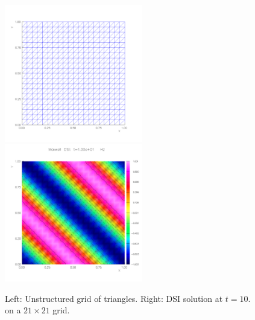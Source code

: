 \documentclass[10pt]{article}
\newcommand{\maxDoc}{\homeHenshaw/res/maxwell/doc}
\begin{document}
{
\newcommand{\figWidtha}{6cm}
\begin{figure}
\begin{center}
\includegraphics[width=\figWidtha]{figures/sqtriGrid}
\includegraphics[width=\figWidtha]{figures/dsiSqTri21-t10}
\end{center}
\caption{Left: Unstructured grid of triangles. Right: DSI solution at $t=10.$ on a $21\times 21$ grid.}
\end{figure}
}
\end{document}
